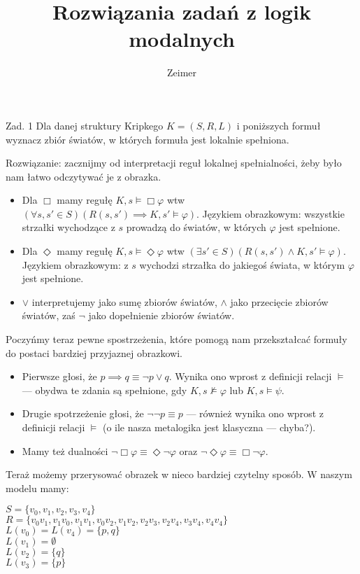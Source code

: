 \documentclass[11pt]{article}
\renewcommand{\phi}{\varphi}
\begin{document}
	\title{Rozwiązania zadań z logik modalnych}
	\author{Zeimer}
	\date{}
	\maketitle
	
	\par Zad. 1 Dla danej struktury Kripkego $K = (S, R, L)$ i poniższych formuł wyznacz zbiór światów, w których formuła jest lokalnie spełniona.
	\par Rozwiązanie: zacznijmy od interpretacji reguł lokalnej spełnialności, żeby było nam łatwo odczytywać je z obrazka.
	\begin{itemize}
		\item Dla $\Box$ mamy regułę $K, s \models \Box \phi$ wtw $(\forall s, s' \in S)(R(s, s') \implies K, s' \models \phi)$. Językiem obrazkowym: wszystkie strzałki wychodzące z $s$ prowadzą do światów, w których $\phi$ jest spełnione.
		\item Dla $\Diamond$ mamy regułę $K, s \models \Diamond \phi$ wtw $(\exists s' \in S)(R(s, s') \land K, s' \models \phi)$. Językiem obrazkowym: z $s$ wychodzi strzałka do jakiegoś świata, w którym $\phi$ jest spełnione.
		\item $\lor$ interpretujemy jako sumę zbiorów światów, $\land$ jako przecięcie zbiorów światów, zaś $\neg$ jako dopełnienie zbiorów światów.
	\end{itemize}
	\par Poczyńmy teraz pewne spostrzeżenia, które pomogą nam przekształcać formuły do postaci bardziej przyjaznej obrazkowi.
	\begin{itemize}
		\item Pierwsze głosi, że $p \implies q \equiv \neg p \lor q$. Wynika ono wprost z definicji relacji $\models$ — obydwa te zdania są spełnione, gdy $K, s \not\models \phi$ lub $K, s \models \psi$.
		\item Drugie spotrzeżenie głosi, że $\neg\neg p \equiv p$ — również wynika ono wprost z definicji relacji $\models$ (o ile nasza metalogika jest klasyczna — chyba?).
		\item Mamy też dualności $\neg \Box \phi \equiv \Diamond \neg \phi$ oraz $\neg \Diamond \phi \equiv \Box \neg \phi$.
	\end{itemize}

	\par Teraż możemy przerysować obrazek w nieco bardziej czytelny sposób. W naszym modelu mamy:
	\begin{center}
		$S = \{v_0, v_1, v_2, v_3, v_4\}$ \\
		$R = \{v_0 v_1, v_1 v_0, v_1 v_1, v_0 v_2, v_1 v_2, v_2 v_3, v_2 v_4, v_3 v_4, v_4 v_4\}$ \\
		$L(v_0) = L(v_4) = \{p, q\}$ \\
		$L(v_1) = \emptyset$ \\
		$L(v_2) = \{q\}$ \\
		$L(v_3) = \{p\}$
	\end{center}
	
\end{document}
